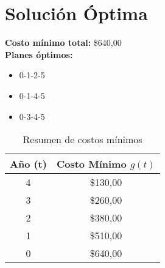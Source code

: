 \documentclass[12pt]{article}
\begin{document}
\clearpage
\section*{Solución Óptima}
\textbf{Costo mínimo total:} \$640,00\\
\textbf{Planes óptimos:}\\
\begin{itemize}
\item 0-1-2-5
\item 0-1-4-5
\item 0-3-4-5
\end{itemize}
\begin{table}[H]
\centering
\caption{Resumen de costos mínimos}
\begin{tabular}{cc}
\toprule
Año (t) & Costo Mínimo $g(t)$ \\
\midrule
4 & \$130,00 \\
3 & \$260,00 \\
2 & \$380,00 \\
1 & \$510,00 \\
0 & \$640,00 \\
\bottomrule
\end{tabular}
\end{table}
\end{document}

